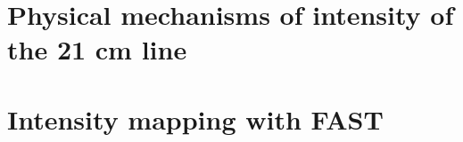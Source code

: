 \documentclass{article}
\begin{document}
\section{Physical mechanisms of intensity of the 21 cm line}

\section{Intensity mapping with FAST}
\end{document}
